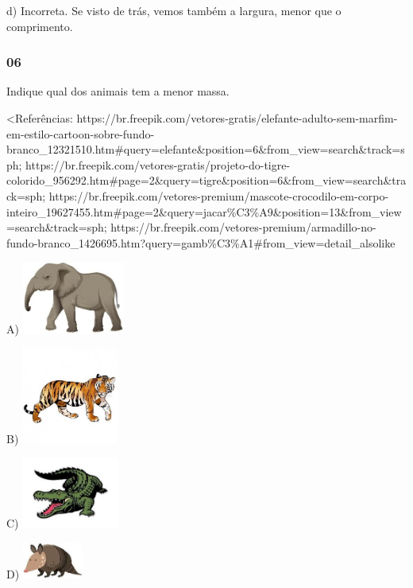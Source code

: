 d) Incorreta. Se visto de trás, vemos também a largura, menor que o
comprimento.

\subsubsection{06 }\label{section-122}

Indique qual dos animais tem a menor massa.

\textless{}Referências:
https://br.freepik.com/vetores-gratis/elefante-adulto-sem-marfim-em-estilo-cartoon-sobre-fundo-branco\_12321510.htm\#query=elefante\&position=6\&from\_view=search\&track=sph;
https://br.freepik.com/vetores-gratis/projeto-do-tigre-colorido\_956292.htm\#page=2\&query=tigre\&position=6\&from\_view=search\&track=sph;
https://br.freepik.com/vetores-premium/mascote-crocodilo-em-corpo-inteiro\_19627455.htm\#page=2\&query=jacar\%C3\%A9\&position=13\&from\_view=search\&track=sph;
https://br.freepik.com/vetores-premium/armadillo-no-fundo-branco\_1426695.htm?query=gamb\%C3\%A1\#from\_view=detail\_alsolike

A)
\includegraphics[width=1.32371in,height=0.93254in]{media/image147.jpg}

B)
\includegraphics[width=1.25000in,height=1.25000in]{media/image148.jpg}

C)
\includegraphics[width=1.25876in,height=0.90692in]{media/image149.jpg}

D)
\includegraphics[width=0.78483in,height=0.47141in]{media/image150.jpg}

